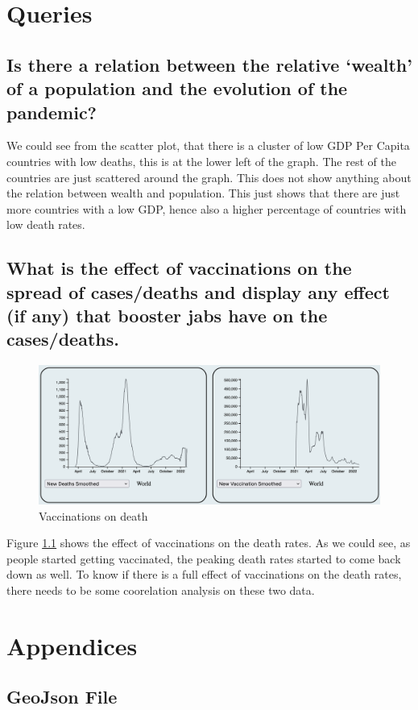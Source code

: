 \documentclass{scrreprt}
\begin{document}
\newpage
\chapter{Queries}
\section{Is there a relation between the relative ‘wealth’ of a population and the evolution of the pandemic?}
We could see from the scatter plot, that there is a cluster of low GDP Per Capita countries with low deaths, this is at the lower left of the graph. The rest of the countries are just scattered around the graph. This does not show anything about the relation between wealth and population. This just shows that there are just more countries with a low GDP, hence also a higher percentage of countries with low death rates. 

\section{What is the effect of vaccinations on the spread of cases/deaths and display any effect (if any) that booster jabs have on the cases/deaths.}
\begin{figure}[H]
    \centering
    \includegraphics[height=0.3\textwidth]{images/death-vacc.png}
    \caption{Vaccinations on death}
    \label{fig:vacc-death}
\end{figure}
Figure \ref{fig:vacc-death} shows the effect of vaccinations on the death rates. As we could see, as people started getting vaccinated, the peaking death rates started to come back down as well. To know if there is a full effect of vaccinations on the death rates, there needs to be some coorelation analysis on these two data. 


\newpage
\chapter{Appendices}
\section{GeoJson File}

\end{document}
